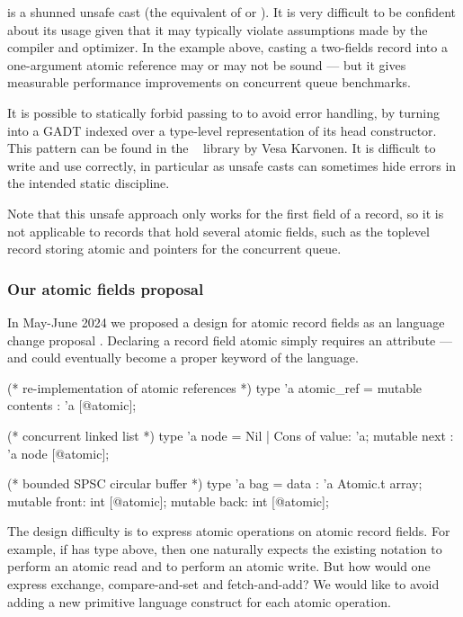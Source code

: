  is a shunned unsafe cast (the \OCaml equivalent of  or ).
It is very difficult to be confident about its usage given that it may typically violate assumptions made by the \OCaml compiler and optimizer.
In the example above, casting a two-fields record into a one-argument atomic reference may or may not be sound --- but it gives measurable performance improvements on concurrent queue benchmarks.

It is possible to statically forbid passing  to  to avoid error handling, by turning  into a GADT indexed over a type-level representation of its head constructor.
This pattern can be found in the \Kcas~\citep*{kcas} library by Vesa Karvonen.
It is difficult to write and use correctly, in particular as unsafe casts can sometimes hide errors in the intended static discipline.

Note that this unsafe approach only works for the first field of a record, so it is not applicable to records that hold several atomic fields, such as the toplevel record storing atomic  and  pointers for the concurrent queue.

\subsubsection{Our atomic fields proposal}

In May-June 2024 we proposed a design for atomic record fields as an \OCaml language change proposal
.
Declaring a record field atomic simply requires an \ocamlinline{[@atomic]} attribute --- and could eventually become a proper keyword of the language.

\begin{ocamlcode}
(* re-implementation of atomic references *)
type 'a atomic_ref = { mutable contents : 'a [@atomic]; }

(* concurrent linked list *)
type 'a node = Nil | Cons of { value: 'a; mutable next : 'a node [@atomic]; }

(* bounded SPSC circular buffer *)
type 'a bag = { data : 'a Atomic.t array;
                mutable front: int [@atomic];
                mutable back: int [@atomic]; }
\end{ocamlcode}

The design difficulty is to express atomic operations on atomic record fields.
For example, if  has type  above, then one naturally expects the existing notation  to perform an atomic read and  to perform an atomic write.
But how would one express exchange, compare-and-set and fetch-and-add?
We would like to avoid adding a new primitive language construct for each atomic operation.


